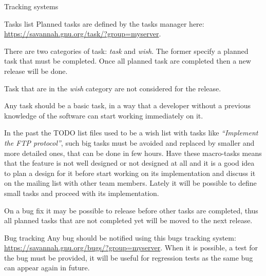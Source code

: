 \documentclass[12pt]{article}
\begin{document}
\begin{section}{Tracking systems}
\begin{subsection}{Tasks list}
Planned tasks are defined by the tasks manager here:
\url{https://savannah.gnu.org/task/?group=myserver}.

There are two categories of task: \textit{task} and \textit{wish}.
The former specify a planned task that must be completed.  Once all
planned task are completed then a new release will be done.

Task that are in the \textit{wish} category are not considered for the
release.

Any task should be a basic task, in a way that a developer without a
previous knowledge of the software can start working immediately on
it.

In the past the TODO list files used to be a wish list with tasks like
\textit{``Implement the FTP protocol''}, such big tasks must be
avoided and replaced by smaller and more detailed ones, that can be
done in few hours.
Have these macro-tasks means that the feature is not well designed or
not designed at all and it is a good idea to plan a design for it
before start working on its implementation and discuss it on the
mailing list with other team members.
Lately it will be possible to define small tasks and proceed with its
implementation.

On a bug fix it may be possible to release before other tasks are
completed, thus all planned tasks that are not completed yet will be
moved to the next release.
\end{subsection}

\begin{subsection}{Bug tracking}
Any bug should be notified using this bugs tracking system:
\url{https://savannah.gnu.org/bugs/?group=myserver}.
When it is possible, a test for the bug must be provided, it will be
useful for regression tests as the same bug can appear again in
future.
\end{subsection}
\end{section}
\end{document}
